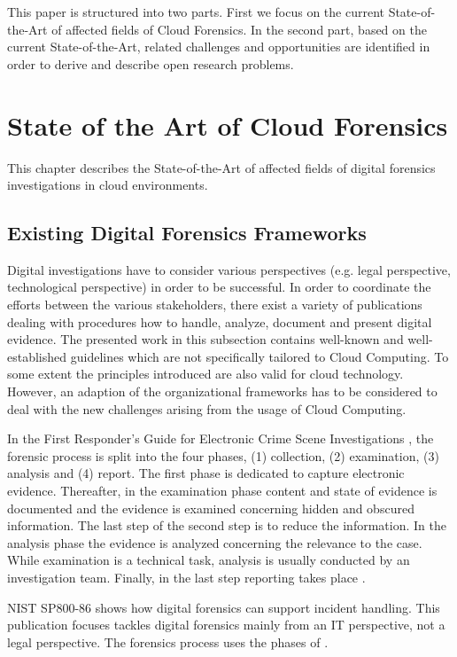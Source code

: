 \documentclass[runningheads,a4paper]{llncs}
\begin{document}
This paper is structured into two parts. First we focus on the current State-of-the-Art of affected fields of Cloud Forensics. In the second part, based on the current State-of-the-Art, related challenges and opportunities are identified in order to derive and describe open research problems. 

\section{State of the Art of Cloud Forensics}

\label{sota}

This chapter describes the State-of-the-Art of affected fields of digital forensics investigations in cloud environments. 

\subsection{Existing Digital Forensics Frameworks}

Digital investigations have to consider various perspectives (e.g. legal perspective, technological perspective) in order to be successful. In order to coordinate the efforts between the various stakeholders, there exist a variety of publications dealing with procedures how to handle, analyze, document and present digital evidence. The presented work in this subsection contains well-known and well-established guidelines which are not specifically tailored to Cloud Computing. To some extent the principles introduced are also valid for cloud technology. However, an adaption of the organizational frameworks has to be considered to deal with the new challenges arising from the usage of Cloud Computing.

In the First Responder's Guide for Electronic Crime Scene Investigations \cite{NIST2001}, the forensic process is split into the four phases, (1) collection, (2) examination, (3) analysis and (4) report. The first phase is dedicated to capture electronic evidence. Thereafter, in the examination phase content and state of evidence is documented and the evidence is examined concerning hidden and obscured information. The last step of the second step is to reduce the information. In the analysis phase the evidence is analyzed concerning the relevance to the case. While examination is a technical task, analysis is usually conducted by an investigation team. Finally, in the last step reporting takes place \cite{NIST2001}. 

NIST SP800-86 \cite{Karen2006} shows how digital forensics can support incident handling. This publication focuses tackles digital forensics mainly from an IT perspective, not a legal perspective. The forensics process uses the phases of \cite{Karen2006}. 
\end{document}

